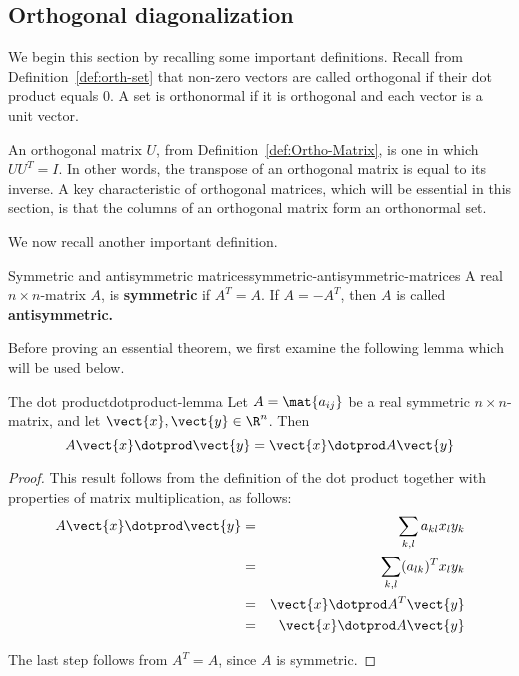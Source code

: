 \subsection{Orthogonal diagonalization}

We begin this section by recalling some important definitions. Recall from Definition~\ref{def:orth-set} that non-zero vectors are called orthogonal if their dot product equals $0$.  A set is orthonormal if it is orthogonal and each vector is a unit vector.

An orthogonal matrix $U$, from Definition~\ref{def:Ortho-Matrix}, is one in which $UU^{T} = I$. In other words, the transpose of an orthogonal matrix is equal to its inverse. A key characteristic of orthogonal matrices, which will be essential in this section, is that the columns of an orthogonal matrix form an orthonormal set.

We now recall another important definition.

\begin{definition}{Symmetric and antisymmetric matrices}{symmetric-antisymmetric-matrices}
A real $n\times n$-matrix $A$, is \textbf{symmetric }if $A^{T}=A$. If $%
A=-A^{T}$, then $A$ is called \textbf{antisymmetric. }
\end{definition}

Before proving an essential theorem, we first examine the following lemma which will be used below.

\begin{lemma}{The dot product}{dotproduct-lemma}
Let $A=\mat{a_{ij} }$ be a real symmetric $n \times n$-matrix, and let $\vect{x}, \vect{y} \in \R^n$. Then
\[
A\vect{x} \dotprod \vect{y} = \vect{x} \dotprod A \vect{y}
\]
\end{lemma}

\begin{proof}
This result follows from the definition of the dot product together with properties of matrix multiplication, as follows:
\begin{eqnarray*}
A\vect{x} \dotprod \vect{y} &=& \sum_{k,l}a_{kl}x_{l}y_{k} \\
&=&\sum_{k,l} (a_{lk})^Tx_{l}y_{k} \\
&=& \vect{x}\dotprod A^{T}\vect{y} \\
&=& \vect{x}\dotprod A \vect{y}
\end{eqnarray*}

The last step follows from $A^T = A$, since $A$ is symmetric.
\end{proof}


